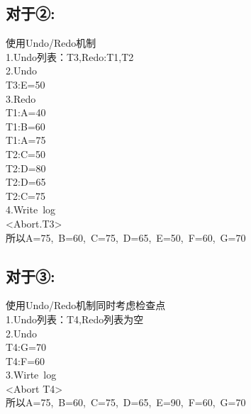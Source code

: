 \documentclass{article}
\begin{document}
	\subsection*{对于②:}
	使用Undo/Redo机制\\
	1.Undo列表：{T3},Redo:{T1,T2}\\
	2.Undo\\
	T3:E=50\\
	3.Redo\\
	T1:A=40\\
	T1:B=60\\
	T1:A=75\\
	T2:C=50\\
	T2:D=80\\
	T2:D=65\\
	T2:C=75\\
	4.Write\ log\\
	<Abort.T3>\\
	所以A=75,\ B=60,\ C=75,\ D=65,\ E=50,\ F=60,\ G=70
	\subsection*{对于③:}
	使用Undo/Redo机制同时考虑检查点\\
	1.Undo列表：{T4},Redo列表为空\\
	2.Undo\\
	T4:G=70\\
	T4:F=60\\
	3.Wirte\ log\\
	<Abort T4>\\
	所以A=75,\ B=60,\ C=75,\ D=65,\ E=90,\ F=60,\ G=70
\end{document}
